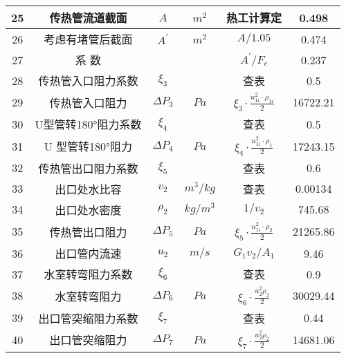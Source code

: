 \begin{table}[H]
{\begin{tabular}{|c|c|c|c|c|c|}
            25   & 传热管流道截面      & $ A $          & $ m^2 $    & 热工计算定                                               & 0.498    \\ \hline
            26   & 考虑有堵管后截面    & $ A^{'} $      & $ m^2 $    & $ A/1.05 $                                               & 0.474    \\ \hline
            27   & 系 数               &                &            & $ A^{'}/F_{c} $                                          & 0.237    \\ \hline
            28   & 传热管入口阻力系数  & $ \xi_3 $      &            & 查表                                                     & 0.5      \\ \hline
            29   & 传热管入口阻力      & $ \Delta P_3 $ & $ Pa $     & $ \xi_{3} \cdot \frac{u_{1 i}^{2} \cdot \rho_{1 i}}{2} $ & 16722.21 \\ \hline
            30   & U型管转180°阻力系数 & $ \xi_4 $      &            & 查表                                                     & 0.5      \\ \hline
            31   & U 型管转180°阻力    & $ \Delta P_4 $ & $ Pa $     & $ \xi_{4} \cdot \frac{u_{1 i}^{2} \cdot \rho_{1 }}{2} $  & 17243.15 \\ \hline
            32   & 传热管出口阻力系数  & $ \xi_5 $      &            & 查表                                                     & 0.6      \\ \hline
            33   & 出口处水比容        & $ v_2 $        & $ m^3/kg $ & 查表                                                     & 0.00134  \\ \hline
            34   & 出口处水密度        & $ \rho_2 $     & $ kg/m^3 $ & $ 1/v_2 $                                                & 745.68   \\ \hline
            35   & 传热管出口阻力      & $ \Delta P_5 $ & $ Pa $     & $ \xi_{5} \cdot \frac{u_{1 i}^{2} \cdot \rho_{2 }}{2} $  & 21265.86 \\ \hline
            36   & 出口管内流速        & $ u_2 $        & $ m/s $    & $ G_1v_2/A_1 $                                           & 9.46     \\ \hline
            37   & 水室转弯阻力系数    & $ \xi_6 $      &            & 查表                                                     & 0.9      \\ \hline
            38   & 水室转弯阻力        & $ \Delta P_6 $ & $ Pa $     & $ \xi_6 \cdot \frac{u_{2}^{2} \rho_2}{2} $               & 30029.44 \\ \hline
            39   & 出口管突缩阻力系数  & $ \xi_7 $      &            & 查表                                                     & 0.44     \\ \hline
            40   & 出口管突缩阻力      & $ \Delta P_7 $ & $ Pa $     & $ \xi_7 \cdot \frac{u_{2}^{2} \rho_2}{2} $               & 14681.06 \\ \hline
        \end{tabular}
    }
\end{table}

